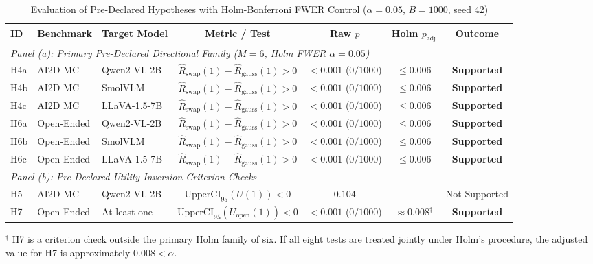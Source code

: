 \documentclass[graybox]{svmult}
\begin{document}
\begin{table}[tb]
\centering
\caption{Evaluation of Pre-Declared Hypotheses with Holm-Bonferroni FWER Control ($\alpha = 0.05$, $B = 1000$, seed 42)}
\label{tab:hypothesis_tests}
{\footnotesize\setlength{\tabcolsep}{3pt}%
\begin{tabular}{lllcccc}
\toprule
\textbf{ID} & \textbf{Benchmark} & \textbf{Target Model} & \textbf{Metric / Test} & \textbf{Raw $p$} & \textbf{Holm $p_{\text{adj}}$} & \textbf{Outcome} \\
\midrule
\multicolumn{7}{l}{\textit{Panel (a): Primary Pre-Declared Directional Family ($M = 6$, Holm FWER $\alpha = 0.05$)}} \\
\midrule
H4a & AI2D MC    & Qwen2-VL-2B  & $\hat{R}_{\text{swap}}(1)-\hat{R}_{\text{gauss}}(1) > 0$ & $< 0.001$ ($0/1000$) & $\le 0.006$ & \textbf{Supported} \\
H4b & AI2D MC    & SmolVLM      & $\hat{R}_{\text{swap}}(1)-\hat{R}_{\text{gauss}}(1) > 0$ & $< 0.001$ ($0/1000$) & $\le 0.006$ & \textbf{Supported} \\
H4c & AI2D MC    & LLaVA-1.5-7B & $\hat{R}_{\text{swap}}(1)-\hat{R}_{\text{gauss}}(1) > 0$ & $< 0.001$ ($0/1000$) & $\le 0.006$ & \textbf{Supported} \\
H6a & Open-Ended & Qwen2-VL-2B  & $\hat{R}_{\text{swap}}(1)-\hat{R}_{\text{gauss}}(1) > 0$ & $< 0.001$ ($0/1000$) & $\le 0.006$ & \textbf{Supported} \\
H6b & Open-Ended & SmolVLM      & $\hat{R}_{\text{swap}}(1)-\hat{R}_{\text{gauss}}(1) > 0$ & $< 0.001$ ($0/1000$) & $\le 0.006$ & \textbf{Supported} \\
H6c & Open-Ended & LLaVA-1.5-7B & $\hat{R}_{\text{swap}}(1)-\hat{R}_{\text{gauss}}(1) > 0$ & $< 0.001$ ($0/1000$) & $\le 0.006$ & \textbf{Supported} \\
\midrule
\multicolumn{7}{l}{\textit{Panel (b): Pre-Declared Utility Inversion Criterion Checks}} \\
\midrule
H5  & AI2D MC    & Qwen2-VL-2B  & $\text{UpperCI}_{95}(U(1)) < 0$                   & $0.104$              & ---         & Not Supported \\
H7  & Open-Ended & At least one & $\text{UpperCI}_{95}(U_{\text{open}}(1)) < 0$     & $< 0.001$ ($0/1000$) & $\approx 0.008$$^\dagger$ & \textbf{Supported} \\
\bottomrule
\end{tabular}}
{\footnotesize $^\dagger$ H7 is a criterion check outside the primary Holm family of six. If all eight tests are treated jointly under Holm's procedure, the adjusted value for H7 is approximately $0.008 < \alpha$.}
\end{table}
\end{document}
